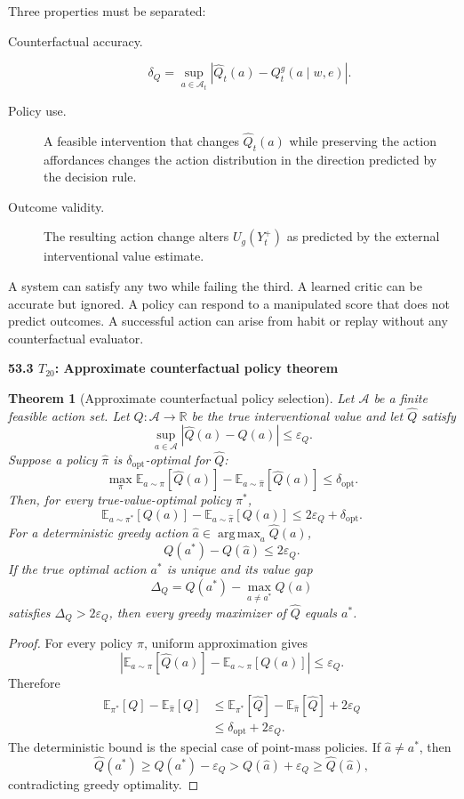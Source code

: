 \documentclass[11pt,letterpaper]{article}
\DeclareMathOperator*{\argmax}{arg\,max}
\newcommand{\subtopic}[1]{%
 \vspace{0.45em}
 {\bfseries\color{AccentColor} #1\par}
}
\theoremstyle{plain}
\newtheorem{theorem}{Theorem}
\theoremstyle{definition}
\begin{document}
Three properties must be separated:
\begin{description}
\item[Counterfactual accuracy.]
\[
\delta_Q
=
\sup_{a\in\mathcal A_t}
|\widehat Q_t(a)-Q_t^g(a\mid w,e)|.
\]

\item[Policy use.]
A feasible intervention that changes \(\widehat Q_t(a)\) while preserving the
action affordances changes the action distribution in the direction predicted
by the decision rule.

\item[Outcome validity.]
The resulting action change alters \(U_g(Y_t^+)\) as predicted by the external
interventional value estimate.
\end{description}

A system can satisfy any two while failing the third. A learned critic can be
accurate but ignored. A policy can respond to a manipulated score that does
not predict outcomes. A successful action can arise from habit or replay
without any counterfactual evaluator.

\subtopic{53.3 \(T_{20}\): Approximate counterfactual policy theorem }

\begin{theorem}[Approximate counterfactual policy selection]
\label{thm:counterfactual-policy}
Let \(\mathcal A\) be a finite feasible action set. Let \(Q:\mathcal A\to
\mathbb R\) be the true interventional value and let \(\widehat Q\) satisfy
\[
\sup_{a\in\mathcal A}|\widehat Q(a)-Q(a)|\leq\varepsilon_Q.
\]
Suppose a policy \(\widehat\pi\) is \(\delta_{\mathrm{opt}}\)-optimal for
\(\widehat Q\):
\[
\max_{\pi}
\mathbb E_{a\sim\pi}[\widehat Q(a)]
-
\mathbb E_{a\sim\widehat\pi}[\widehat Q(a)]
\leq
\delta_{\mathrm{opt}}.
\]
Then, for every true-value-optimal policy \(\pi^*\),
\[
\boxed{
\mathbb E_{a\sim\pi^*}[Q(a)]
-
\mathbb E_{a\sim\widehat\pi}[Q(a)]
\leq
2\varepsilon_Q+\delta_{\mathrm{opt}}.
}
\]
For a deterministic greedy action \(\widehat a\in\argmax_a\widehat Q(a)\),
\[
Q(a^*)-Q(\widehat a)
\leq2\varepsilon_Q.
\]
If the true optimal action \(a^*\) is unique and its value gap
\[
\Delta_Q
=
Q(a^*)-
\max_{a\neq a^*}Q(a)
\]
satisfies \(\Delta_Q>2\varepsilon_Q\), then every greedy maximizer of
\(\widehat Q\) equals \(a^*\).
\end{theorem}

\begin{proof}
For every policy \(\pi\), uniform approximation gives
\[
\left|
\mathbb E_{a\sim\pi}[\widehat Q(a)]
-
\mathbb E_{a\sim\pi}[Q(a)]
\right|
\leq\varepsilon_Q.
\]
Therefore
\[
\begin{aligned}
\mathbb E_{\pi^*}[Q]
-
\mathbb E_{\widehat\pi}[Q]
&\leq
\mathbb E_{\pi^*}[\widehat Q]
-
\mathbb E_{\widehat\pi}[\widehat Q]
+2\varepsilon_Q\\
&\leq
\delta_{\mathrm{opt}}+2\varepsilon_Q.
\end{aligned}
\]
The deterministic bound is the special case of point-mass policies. If
\(\widehat a\neq a^*\), then
\[
\widehat Q(a^*)
\geq
Q(a^*)-\varepsilon_Q
>
Q(\widehat a)+\varepsilon_Q
\geq
\widehat Q(\widehat a),
\]
contradicting greedy optimality.
\end{proof}
\end{document}
